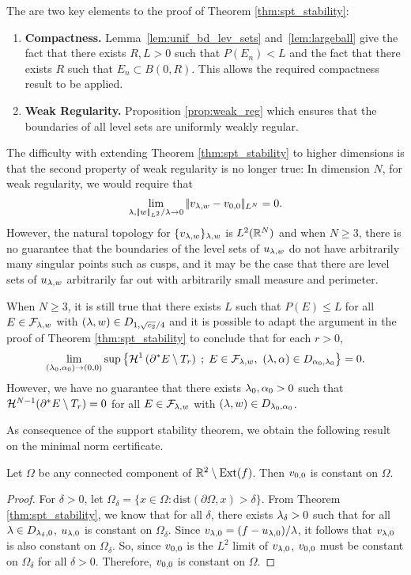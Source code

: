 \begin{rem}
The are two key elements to the proof of Theorem \ref{thm:spt_stability}: \begin{enumerate}
\item  \textbf{Compactness.} Lemma~\ref{lem:unif_bd_lev_sets} and~\ref{lem:largeball}  give the fact that there exists $R,L>0$ such that $P(E_n)<L$ and the fact that there exists $R$ such that $E_n\subset B(0,R)$. This  allows the required compactness result to be applied.
\item \textbf{Weak Regularity.} Proposition \ref{prop:weak_reg} which ensures that the boundaries of all level sets are uniformly weakly  regular.
\end{enumerate}
The difficulty with extending Theorem \ref{thm:spt_stability} to higher dimensions is that the second property of weak regularity is no longer true: In dimension $N$, for weak regularity, we would require that $$\lim_{\lambda,|\!| w |\!|_{L^2}/\lambda\to 0}|\!| v_{\lambda,w}-v_{0,0} |\!|_{L^N}=0.$$ However, the natural topology for $\{v_{\lambda,w}\}_{\lambda,w}$ is $L^2(\mathbb{R}^N)$ and when $N\geq 3$, there is no guarantee that the boundaries of the level sets of $u_{\lambda,w}$ do not have arbitrarily many singular points such as cusps, and it may be the case that there are level sets of $u_{\lambda,w}$ arbitrarily far out with arbitrarily small measure and perimeter.

When $N\geq 3$, it is still true that there exists $L$ such that $P(E)\leq L$ for all $E\in\mathcal{F}_{\lambda,w}$ with $(\lambda,w)\in D_{1,\sqrt{c_2}/4}$ and it is  possible to adapt the argument in the proof of Theorem \ref{thm:spt_stability} to conclude that for each $r>0$,
$$\lim_{(\la_0,\alpha_0)\to (0,0)} \sup \enscond{\HDU{\partial^*\Elaws\setminus T_r}}{\Elaws \in \FFlaw,\ (\la,\alpha)\in \lnr{\alpha_0}{\la_0}}=0.$$
However, we have no guarantee that there exists $\lambda_0,\alpha_0>0$ such that $\mathcal{H}^{N-1}(\partial^* E\setminus T_r) = 0$ for all $E\in \mathcal{F}_{\lambda,w}$ with $(\lambda,w)\in D_{\lambda_0,\alpha_0}$.
\end{rem}




As consequence of the support stability theorem, we obtain the following result on the minimal norm certificate.
\begin{cor}\label{cor:extspt}
Let $\Omega$ be any connected component of $\mathbb{R}^2\setminus \mathrm{Ext}(f)$. Then $v_{0,0}$ is constant on $\Omega$. 
\end{cor} 
\begin{proof}
For $\delta>0$, let $\Omega_\delta = \{x\in\Omega : \mathrm{dist}(\partial \Omega, x)>\delta\}$.
From Theorem  \ref{thm:spt_stability}, we know that for all $\delta$, there exists $\lambda_\delta>0$ such that for all $\lambda\in D_{\lambda_\delta, 0}$, $u_{\lambda,0}$ is constant on $\Omega_\delta$. Since $v_{\lambda,0} = (f-u_{\lambda,0})/\lambda$, it follows that $v_{\lambda,0}$ is also constant on $\Omega_\delta$. So, since $v_{0,0}$ is the $L^2$ limit of $v_{\lambda,0}$, $v_{0,0}$ must be constant on $\Omega_\delta$ for all $\delta>0$. Therefore, $v_{0,0}$ is constant on $\Omega$.
\end{proof}

